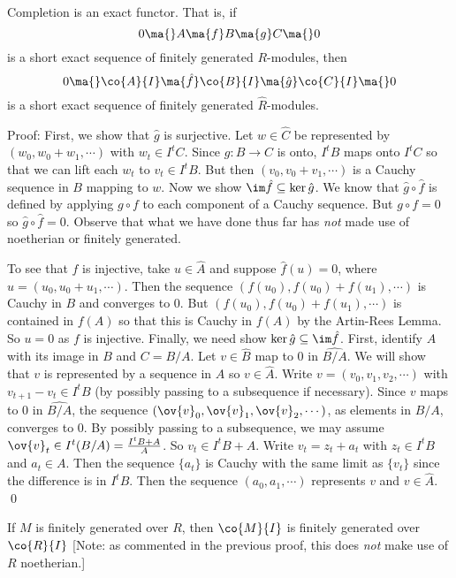 \begin{prop}
Completion is an exact functor. That is, if 
\[
0 \ma{} A \ma{f} B \ma{g} C \ma{} 0
\]
is a short exact sequence of finitely generated $R$-modules, then
\[
0 \ma{} \co{A}{I} \ma{\hat{f}} \co{B}{I} \ma{\hat{g}} \co{C}{I} \ma{} 0
\]
is a short exact sequence of finitely generated $\hat{R}$-modules. 
\end{prop}

\noindent Proof: First, we show that $\hat{g}$ is surjective. Let $w \in \hat{C}$ be represented by $(w_0,w_0+w_1,\cdots)$ with $w_t \in I^tC$. Since $g: B \to C$ is onto, $I^tB$ maps onto $I^tC$ so that we can lift each $w_t$ to $v_t \in I^tB$. But then $(v_0,v_0+v_1,\cdots)$ is a Cauchy sequence in $B$ mapping to $w$. Now we show $\im \hat{f} \subseteq \ker \hat{g}$. We know that $\hat{g} \circ \hat{f}$ is defined by applying $g \circ f$ to each component of a Cauchy sequence. But $g \circ f=0$ so $\hat{g} \circ \hat{f}=0$. Observe that what we have done thus far has \emph{not} made use of noetherian or finitely generated. 

To see that $\hat{f}$ is injective, take $u \in \hat{A}$ and suppose $\hat{f}(u)=0$, where $u=(u_0,u_0+u_1,\cdots)$. Then the sequence $(f(u_0),f(u_0)+f(u_1),\cdots)$ is Cauchy in $B$ and converges to 0. But $(f(u_0),f(u_0)+f(u_1),\cdots)$ is contained in $f(A)$ so that this is Cauchy in $f(A)$ by the Artin-Rees Lemma. So $u=0$ as $f$ is injective. Finally, we need show $\ker \hat{g} \subseteq \im \hat{f}$. First, identify $A$ with its image in $B$ and $C=B/A$. Let $v \in \hat{B}$ map to 0 in $\hat{B/A}$. We will show that $v$ is represented by a sequence in $A$ so $v \in \hat{A}$. Write $v=(v_0,v_1,v_2,\cdots)$ with $v_{t+1}-v_t \in I^tB$ (by possibly passing to a subsequence if necessary). Since $v$ maps to 0 in $\hat{B/A}$, the sequence $(\ov{v}_0,\ov{v}_1,\ov{v}_2,\cdots)$, as elements in $B/A$, converges to 0. By possibly passing to a subsequence, we may assume $\ov{v}_t \in I^t(B/A)=\frac{I^tB+A}{A}$. So $v_t \in I^tB+A$. Write $v_t=z_t+a_t$ with $z_t \in I^tB$ and $a_t \in A$. Then the sequence $\{a_t\}$ is Cauchy with the same limit as $\{v_t\}$ since the difference is in $I^tB$. Then the sequence $(a_0,a_1,\cdots)$ represents $v$ and $v \in \hat{A}$. \qed \\

\begin{cor}
If $M$ is finitely generated over $R$, then $\co{M}{I}$ is finitely generated over $\co{R}{I}$ [Note: as commented in the previous proof, this does \emph{not} make use of $R$ noetherian.]
\end{cor}

